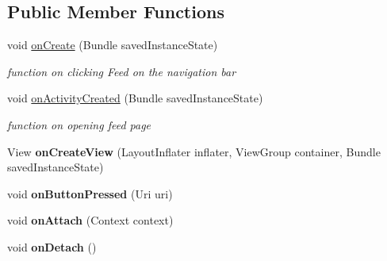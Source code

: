 \subsection*{Public Member Functions}
\begin{DoxyCompactItemize}
\item 
void \hyperlink{classcom_1_1example_1_1sel_1_1lostfound_1_1FeedFragment_a027942ee12844b17c604195b91f9948d}{on\+Create} (Bundle saved\+Instance\+State)\hypertarget{classcom_1_1example_1_1sel_1_1lostfound_1_1FeedFragment_a027942ee12844b17c604195b91f9948d}{}\label{classcom_1_1example_1_1sel_1_1lostfound_1_1FeedFragment_a027942ee12844b17c604195b91f9948d}

\begin{DoxyCompactList}\small\item\em function on clicking \textquotesingle{}Feed\textquotesingle{} on the navigation bar \end{DoxyCompactList}\item 
void \hyperlink{classcom_1_1example_1_1sel_1_1lostfound_1_1FeedFragment_abb8194bc01339ece4f650c3b7e716a5f}{on\+Activity\+Created} (Bundle saved\+Instance\+State)
\begin{DoxyCompactList}\small\item\em function on opening feed page \end{DoxyCompactList}\item 
View {\bfseries on\+Create\+View} (Layout\+Inflater inflater, View\+Group container, Bundle saved\+Instance\+State)\hypertarget{classcom_1_1example_1_1sel_1_1lostfound_1_1FeedFragment_a4e2cc79785d7392af2839c0b3900b12b}{}\label{classcom_1_1example_1_1sel_1_1lostfound_1_1FeedFragment_a4e2cc79785d7392af2839c0b3900b12b}

\item 
void {\bfseries on\+Button\+Pressed} (Uri uri)\hypertarget{classcom_1_1example_1_1sel_1_1lostfound_1_1FeedFragment_a4a39372816f2c53d6ff1b3d12be98c23}{}\label{classcom_1_1example_1_1sel_1_1lostfound_1_1FeedFragment_a4a39372816f2c53d6ff1b3d12be98c23}

\item 
void {\bfseries on\+Attach} (Context context)\hypertarget{classcom_1_1example_1_1sel_1_1lostfound_1_1FeedFragment_a63947b4cbebd081d42113ff157a2f6b0}{}\label{classcom_1_1example_1_1sel_1_1lostfound_1_1FeedFragment_a63947b4cbebd081d42113ff157a2f6b0}

\item 
void {\bfseries on\+Detach} ()\hypertarget{classcom_1_1example_1_1sel_1_1lostfound_1_1FeedFragment_a1cc06e44e371cfc7f6b0bb5da15f78f0}{}\label{classcom_1_1example_1_1sel_1_1lostfound_1_1FeedFragment_a1cc06e44e371cfc7f6b0bb5da15f78f0}

\end{DoxyCompactItemize}
